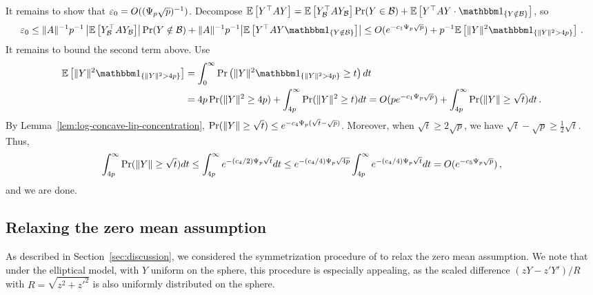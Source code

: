 \documentclass[times,sort&compress,3p]{elsarticle}
\begin{document}
It remains to show that $\varepsilon_0 = O( (\Psi_p\sqrt{p})^{-1})$. Decompose $\E\left[ Y^\T A Y \right] = \E\left[ Y_\Bc^\T A Y_\Bc \right]\Pr(Y\in \Bc) + \E\left[ Y^\T A Y \cdot \indic{Y\notin \Bc} \right]$, so
\begin{align*}
    \varepsilon_0 
    \le  \|A\|^{-1}{ p^{-1}\left| \E\left[ Y_\Bc^\T A Y_\Bc \right] \right|\Pr(Y\notin \Bc)} + \|A\|^{-1}p^{-1}{\left| \E\left[ Y^\T A Y  \indic{Y\notin \Bc} \right] \right|}
    \le O(e^{-c_1\Cheeger\sqrt{p}}) + p^{-1}\E\left[\|Y\|^2  \indic{\|Y\|^2>4p} \right] \,.
\end{align*}
It remains to bound the second term above. Use
\begin{align*}
    \E\left[\|Y\|^2 \indic{\|Y\|^2>4p} \right] 
    &= \int_{0}^\infty \Pr\left( \|Y\|^2  \indic{\|Y\|^2>4p} \ge t \right)dt  
     \\
    &= 4p \Pr(\|Y\|^2\ge 4p) + \int_{4p}^{\infty} \Pr(\|Y\|^2\ge t)dt 
    = O(pe^{-c_1\Cheeger\sqrt{p}}) + \int_{4p}^{\infty} \Pr(\|Y\|\ge \sqrt{t})dt \,.
\end{align*}
By Lemma~\ref{lem:log-concave-lip-concentration}, 
$\Pr(\|Y\|\ge \sqrt{t})\le e^{-c_4\Psi_p(\sqrt{t}-\sqrt{p})}$. Moreover, when $\sqrt{t}\ge 2\sqrt{p}$, we have $\sqrt{t}-\sqrt{p}\ge \frac12\sqrt{t}$. Thus,
\[
\int_{4p}^{\infty} \Pr(\|Y\|\ge \sqrt{t})dt \le \int_{4p}^{\infty} e^{-(c_4/2)\Psi_p\sqrt{t}} dt \le e^{-(c_4/4)\Psi_p\sqrt{4p}}\int_{4p}^{\infty} e^{-(c_4/4)\Psi_p\sqrt{t}} dt = O(e^{-c_5\Psi_p\sqrt{p}})\,,
\]
and we are done. 

\subsection{Relaxing the zero mean assumption}
\label{sec:appendix-zero-mean}

As described in Section~\ref{sec:discussion}, we considered the symmetrization procedure of \cite{dumbgen1998tyler} to relax the zero mean assumption. We note that under the elliptical model, with $Y$ uniform on the sphere, this procedure is especially appealing, as  
the scaled difference
$(zY-z'Y')/R$ with $R=\sqrt{z^2+z'^2}$
is also uniformly distributed on the sphere. 
\end{document}
